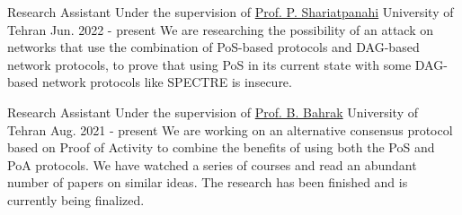 

\begin{cventries}

  \cventry
    {Research Assistant} %
    {Under the supervision of \href{https://profile.ut.ac.ir/en/~p.shariatpanahi}{Prof. P. Shariatpanahi}} %
    {University of Tehran} %
    {Jun. 2022 - present} %
    {
      We are researching the possibility of an attack on networks that use the combination of PoS-based protocols and DAG-based network protocols, to prove that using PoS in its current state with some DAG-based network protocols like SPECTRE is insecure.
    }

  \cventry
    {Research Assistant} %
    {Under the supervision of \href{https://ece.ut.ac.ir/en/~bahrak}{Prof. B. Bahrak}} %
    {University of Tehran} %
    {Aug. 2021 - present} %
    {
      We are working on an alternative consensus protocol based on Proof of Activity to combine the benefits of using both the PoS and PoA protocols. We have watched a series of courses and read an abundant number of papers on similar ideas. The research has been finished and is currently being finalized.
    }

\end{cventries}
